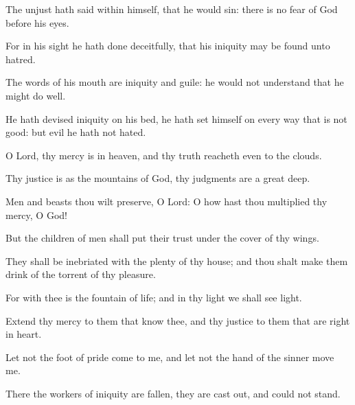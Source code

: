 ﻿\item The unjust hath said within himself, that he would sin: there is no fear of God before his eyes.
\item For in his sight he hath done deceitfully, that his iniquity may be found unto hatred.
\item The words of his mouth are iniquity and guile: he would not understand that he might do well.
\item He hath devised iniquity on his bed, he hath set himself on every way that is not good: but evil he hath not hated.
\item O Lord, thy mercy is in heaven, and thy truth reacheth even to the clouds.
\item Thy justice is as the mountains of God, thy judgments are a great deep.
\item Men and beasts thou wilt preserve, O Lord: O how hast thou multiplied thy mercy, O God!
\item But the children of men shall put their trust under the cover of thy wings.
\item They shall be inebriated with the plenty of thy house; and thou shalt make them drink of the torrent of thy pleasure.
\item For with thee is the fountain of life; and in thy light we shall see light.
\item Extend thy mercy to them that know thee, and thy justice to them that are right in heart.
\item Let not the foot of pride come to me, and let not the hand of the sinner move me.
\item There the workers of iniquity are fallen, they are cast out, and could not stand.